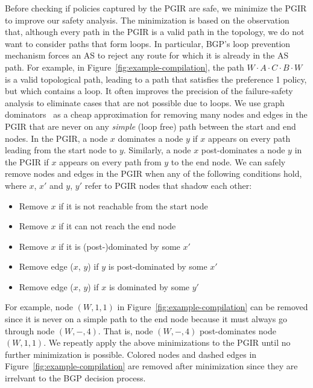 \documentclass[10pt]{sigalternate052015}
\begin{document}
Before checking if policies captured by the PGIR are safe, we minimize the PGIR to improve our safety analysis. 
The minimization is based on the observation that, although every path in the PGIR is a valid path in the topology, we do not want to consider paths that form loops. In particular, BGP's loop prevention mechanism forces an AS to reject any route for which it is already in the AS path.
%
For example, in Figure~\ref{fig:example-compilation}, the path $W \cdot A \cdot C \cdot B \cdot W$ is a valid topological path, leading to a path that satisfies the preference 1 policy, but which contains a loop.
%
It often improves the precision of the failure-safety analysis to eliminate cases that are not possible due to loops. 
We use graph dominators~\cite{tarjan-dominance} as a cheap approximation for removing many nodes and edges in the PGIR that are never on any \emph{simple} (loop free) path between the start and end nodes.
In the PGIR, a node $x$ dominates a node $y$ if $x$ appears on every path leading from the start node to $y$. Similarly, a node $x$ post-dominates a node $y$ in the PGIR if $x$ appears on every path from $y$ to the end node.
We can safely remove nodes and edges in the PGIR when any of the following conditions hold, where $x$, $x'$ and $y$, $y'$ refer to PGIR nodes that shadow each other:
\begin{itemize}
\setlength{\itemsep}{1pt}
\setlength{\parskip}{0pt}
\setlength{\parsep}{0pt}
\item Remove $x$ if it is not reachable from the start node
\item Remove $x$ if it can not reach the end node
\item Remove $x$ if it is (post-)dominated by some $x'$
\item Remove edge ($x$, $y$) if $y$ is post-dominated by some $x'$
\item Remove edge ($x$, $y$) if $x$ is dominated by some $y'$
\end{itemize}
For example, node $(W,1,1)$ in Figure~\ref{fig:example-compilation} can be removed since it is never on a simple path to the end node because it must always go through node $(W,-,4)$. That is, node $(W,-,4)$ post-dominates node $(W,1,1)$. We repeatly apply the above minimizations to the PGIR until no further minimization is possible.
Colored nodes and dashed edges in Figure~\ref{fig:example-compilation} are removed after minimization since they are irrelvant to the BGP decision process.
%
\end{document}
